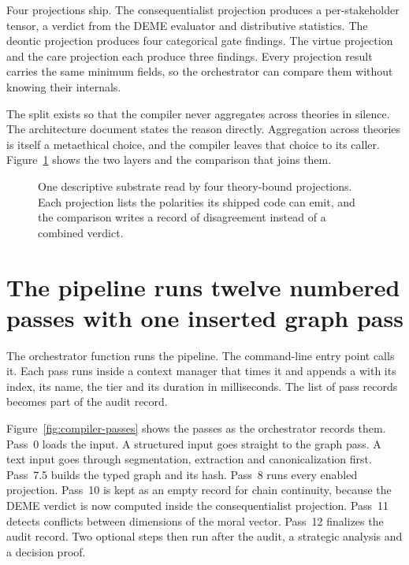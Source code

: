 Four projections ship. The consequentialist projection produces a per-stakeholder tensor, a
verdict from the DEME evaluator and distributive statistics. The deontic projection produces four
categorical gate findings. The virtue projection and the care projection each produce three
findings. Every projection result carries the same minimum fields, so the orchestrator can compare
them without knowing their internals.

The split exists so that the compiler never aggregates across theories in silence. The
architecture document states the reason directly. Aggregation across theories is itself a
metaethical choice, and the compiler leaves that choice to its caller.
Figure~\ref{fig:compiler-two-layer} shows the two layers and the comparison that joins them.

\begin{figure}[t]
\centering

\caption{One descriptive substrate read by four theory-bound projections. Each projection lists
the polarities its shipped code can emit, and the comparison writes a record of disagreement
instead of a combined verdict.}
\label{fig:compiler-two-layer}
\end{figure}

\section{The pipeline runs twelve numbered passes with one inserted graph pass}\label{sec:compiler-pipeline}

The orchestrator function  runs the pipeline. The command-line entry point
 calls it. Each pass runs inside a context manager that times it and appends a
 with its index, its name, the tier and its duration in milliseconds. The list of
pass records becomes part of the audit record.

Figure~\ref{fig:compiler-passes} shows the passes as the orchestrator records them. Pass~0 loads
the input. A structured input goes straight to the graph pass. A text input goes through
segmentation, extraction and canonicalization first. Pass~7.5 builds the typed graph and its hash.
Pass~8 runs every enabled projection. Pass~10 is kept as an empty record for chain continuity,
because the DEME verdict is now computed inside the consequentialist projection. Pass~11 detects
conflicts between dimensions of the moral vector. Pass~12 finalizes the audit record. Two optional
steps then run after the audit, a strategic analysis and a decision proof.

